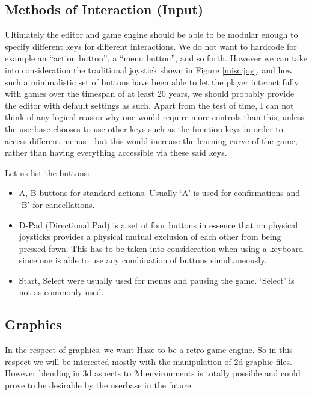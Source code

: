\subsection{Methods of Interaction (Input)}

Ultimately the editor and game engine should be able to be modular enough to 
specify different keys for different interactions. We do not want to hardcode
for example an ``action button'', a ``menu button'', and so forth. However we
can take into consideration the traditional joystick shown in Figure 
\ref{misc:joy}, and how such a minimalistic set of buttons have been able to
let the player interact fully with games over the timespan of at least 20 years,
we should probably provide the editor with default settings as such. Apart from
the test of time, I can not think of any logical reason why one would require
more controls than this, unless the userbase chooses to use other keys such as 
the function keys in order to access different menus - but this would increase
the learning curve of the game, rather than having everything accessible via
these said keys.


Let us list the buttons: 
\begin{itemize}
\item{A, B} buttons for standard actions. Usually `A' is used for confirmations
and `B' for cancellations.
\item{D-Pad (Directional Pad)} is a set of four buttons in essence that on
physical joysticks provides a physical mutual exclusion of each other from 
being pressed fown. This has to be taken into consideration when using a
keyboard since one is able to use any combination of buttons simultaneously.
\item{Start, Select} were usually used for menus and pausing the game. `Select'
is not as commonly used.
\end{itemize}

\subsection{Graphics}

In the respect of graphics, we want Haze to be a retro game engine. So in this
respect we will be interested mostly with the manipulation of 2d graphic files.
However blending in 3d aspects to 2d environments is totally possible and could
prove to be desirable by the userbase in the future.

